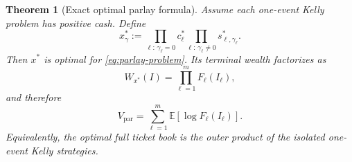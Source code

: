 \documentclass[11pt]{article}
\numberwithin{equation}{section}
\newtheorem{theorem}{Theorem}[section]
\theoremstyle{remark}
\theoremstyle{definition}
\newcommand{\E}{\mathbb{E}}
\newcommand{\1}{\mathbf{1}}
\newcommand{\parlay}{\mathrm{par}}
\begin{document}
\begin{theorem}[Exact optimal parlay formula]
\label{thm:parlay-main}
Assume each one-event Kelly problem has positive cash. Define
\begin{equation}
  x_\gamma^* := \prod_{\ell:\,\gamma_\ell=0} c_\ell^*
  \prod_{\ell:\,\gamma_\ell\neq 0} s_{\ell,\gamma_\ell}^*.
  \label{eq:ticket-product-formula}
\end{equation}
Then $x^*$ is optimal for \eqref{eq:parlay-problem}. Its terminal wealth factorizes as
\begin{equation}
  W_{x^*}(I)=\prod_{\ell=1}^m F_\ell(I_\ell),
  \label{eq:parlay-factorization}
\end{equation}
and therefore
\begin{equation}
  V_\parlay = \sum_{\ell=1}^m \E[\log F_\ell(I_\ell)].
  \label{eq:parlay-value-factorization}
\end{equation}
Equivalently, the optimal full ticket book is the outer product of the isolated one-event Kelly strategies.
\end{theorem}
\end{document}
